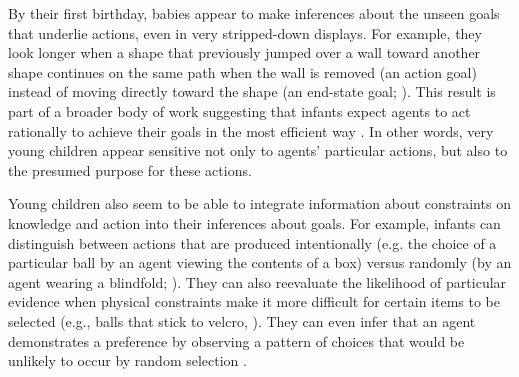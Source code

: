 \documentclass[man]{apa2}
\begin{document}


By their first birthday, babies appear to make inferences about the unseen goals that underlie actions, even in very stripped-down displays.  For example, they look longer when a shape that previously jumped over a wall toward another shape continues on the same path when the wall is removed (an action goal) instead of moving directly toward the shape (an end-state goal; ). This result is part of a broader body of work suggesting that infants expect agents to act rationally to achieve their goals in the most efficient way \cite{csibra1998, gergely2003}. In other words, very young children appear sensitive not only to agents' particular actions, but also to the presumed purpose for these actions. 

Young children also seem to be able to integrate information about constraints on knowledge and action into their inferences about goals. For example, infants can distinguish between actions that are produced intentionally (e.g. the choice of a particular ball by an agent viewing the contents of a box) versus randomly (by an agent wearing a blindfold; ).  They can also reevaluate the likelihood of particular evidence when physical constraints make it more difficult for certain items to be selected (e.g., balls that stick to velcro, ).  They can even infer that an agent demonstrates a preference by observing a pattern of choices that would be unlikely to occur by random selection \cite{kushnir2010}. 
\end{document}

